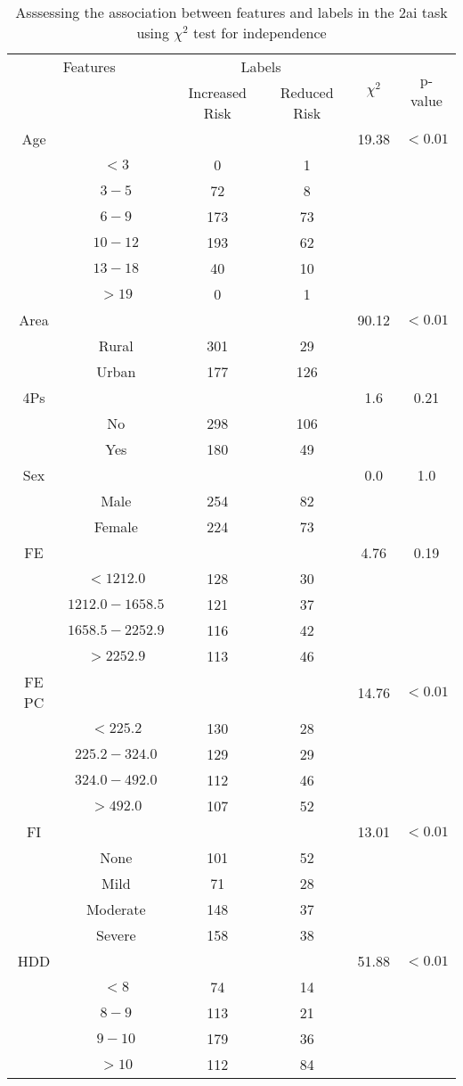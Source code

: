 \begin{table}[!htb]
\centering
\caption{Asssessing the association between features and labels in the 2ai task using $\chi^2$ test for independence}
\label{tab:chitest_2ai}
\begin{tabular}{c c | c c| c | c}
\hline
\multicolumn{2}{c|}{Features}& \multicolumn{2}{c|}{Labels}& \multirow{2}{*}{$\chi^2$} & \multirow{2}{*}{p-value}\\ 
& & Increased Risk & Reduced Risk & & \\ 
\hline
Age &  &  & & 19.38 & $< 0.01$ \\ 
& $< 3$ & 0 & 1& & \\ 
& $3-5$ & 72 & 8& & \\ 
& $6-9$ & 173 & 73& & \\ 
& $10-12$ & 193 & 62& & \\ 
& $13-18$ & 40 & 10& & \\ 
& $> 19$ & 0 & 1& & \\ 
\hline 
Area &  &  & & 90.12 & $< 0.01$ \\ 
& Rural & 301 & 29& & \\ 
& Urban & 177 & 126& & \\ 
\hline 
4Ps &  &  & & 1.6 & 0.21 \\ 
& No & 298 & 106& & \\ 
& Yes & 180 & 49& & \\ 
\hline 
Sex &  &  & & 0.0 & 1.0 \\ 
& Male & 254 & 82& & \\ 
& Female & 224 & 73& & \\ 
\hline 
FE &  &  & & 4.76 & 0.19 \\ 
& $< 1212.0$ & 128 & 30& & \\ 
& $1212.0-1658.5$ & 121 & 37& & \\ 
& $1658.5-2252.9$ & 116 & 42& & \\ 
& $> 2252.9$ & 113 & 46& & \\ 
\hline 
FE PC &  &  & & 14.76 & $< 0.01$ \\ 
& $< 225.2$ & 130 & 28& & \\ 
& $225.2-324.0$ & 129 & 29& & \\ 
& $324.0-492.0$ & 112 & 46& & \\ 
& $> 492.0$ & 107 & 52& & \\ 
\hline 
FI &  &  & & 13.01 & $< 0.01$ \\ 
& None & 101 & 52& & \\ 
& Mild & 71 & 28& & \\ 
& Moderate & 148 & 37& & \\ 
& Severe & 158 & 38& & \\ 
\hline 
HDD &  &  & & 51.88 & $< 0.01$ \\ 
& $< 8$ & 74 & 14& & \\ 
& $8-9$ & 113 & 21& & \\ 
& $9-10$ & 179 & 36& & \\ 
& $> 10$ & 112 & 84& & \\ 
\hline 
\end{tabular}
\end{table}
